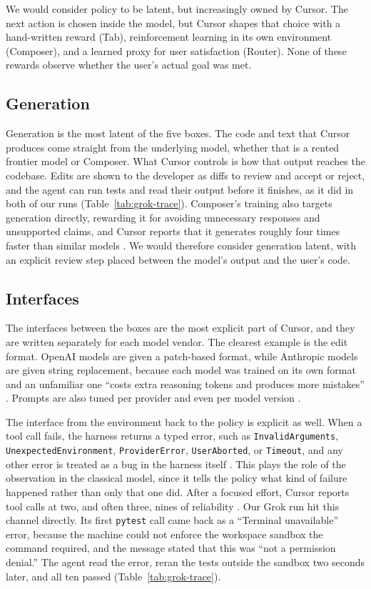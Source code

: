 \documentclass[11pt]{article}
\begin{document}
We would consider policy to be latent, but increasingly owned by Cursor. The next action is chosen inside the model, but Cursor shapes that choice with a hand-written reward (Tab), reinforcement learning in its own environment (Composer), and a learned proxy for user satisfaction (Router). None of these rewards observe whether the user's actual goal was met.

\subsection{Generation}

Generation is the most latent of the five boxes. The code and text that Cursor produces come straight from the underlying model, whether that is a rented frontier model or Composer. What Cursor controls is how that output reaches the codebase. Edits are shown to the developer as diffs to review and accept or reject, and the agent can run tests and read their output before it finishes, as it did in both of our runs (Table~\ref{tab:grok-trace}). Composer's training also targets generation directly, rewarding it for avoiding unnecessary responses and unsupported claims, and Cursor reports that it generates roughly four times faster than similar models \citep{cursor2025composer}. We would therefore consider generation latent, with an explicit review step placed between the model's output and the user's code.

\subsection{Interfaces}

The interfaces between the boxes are the most explicit part of Cursor, and they are written separately for each model vendor. The clearest example is the edit format. OpenAI models are given a patch-based format, while Anthropic models are given string replacement, because each model was trained on its own format and an unfamiliar one ``costs extra reasoning tokens and produces more mistakes'' \citep{heule2026harness}. Prompts are also tuned per provider and even per model version \citep{heule2026harness}.

The interface from the environment back to the policy is explicit as well. When a tool call fails, the harness returns a typed error, such as \texttt{InvalidArguments}, \texttt{UnexpectedEnvironment}, \texttt{ProviderError}, \texttt{UserAborted}, or \texttt{Timeout}, and any other error is treated as a bug in the harness itself \citep{heule2026harness}. This plays the role of the observation in the classical model, since it tells the policy what kind of failure happened rather than only that one did. After a focused effort, Cursor reports tool calls at two, and often three, nines of reliability \citep{heule2026harness}. Our Grok run hit this channel directly. Its first \texttt{pytest} call came back as a ``Terminal unavailable'' error, because the machine could not enforce the workspace sandbox the command required, and the message stated that this was ``not a permission denial.'' The agent read the error, reran the tests outside the sandbox two seconds later, and all ten passed (Table~\ref{tab:grok-trace}).
\end{document}
